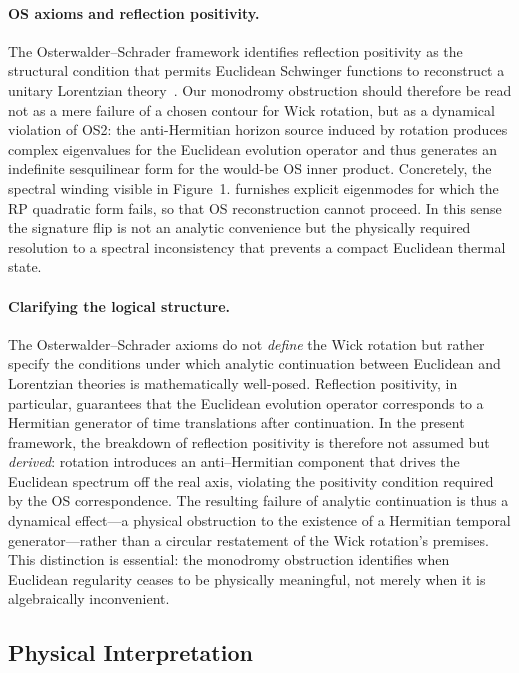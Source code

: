 \documentclass[11pt]{article}
\begin{document}
\paragraph{OS axioms and reflection positivity.}
The Osterwalder--Schrader framework identifies reflection positivity as the structural condition that permits Euclidean Schwinger functions to reconstruct a unitary Lorentzian theory~\cite{NeebOlafsson2018}.  Our monodromy obstruction should therefore be read not as a mere failure of a chosen contour for Wick rotation, but as a dynamical violation of OS2: the anti-Hermitian horizon source induced by rotation produces complex eigenvalues for the Euclidean evolution operator and thus generates an indefinite sesquilinear form for the would-be OS inner product.  Concretely, the spectral winding visible in Figure~1. furnishes explicit eigenmodes for which the RP quadratic form fails, so that OS reconstruction cannot proceed.  In this sense the signature flip is not an analytic convenience but the physically required resolution to a spectral inconsistency that prevents a compact Euclidean thermal state.

\paragraph{Clarifying the logical structure.}
The Osterwalder--Schrader axioms do not \emph{define} the Wick rotation but rather specify the conditions under which analytic continuation between Euclidean and Lorentzian theories is mathematically well-posed.  Reflection positivity, in particular, guarantees that the Euclidean evolution operator corresponds to a Hermitian generator of time translations after continuation.  In the present framework, the breakdown of reflection positivity is therefore not assumed but \emph{derived}: rotation introduces an anti--Hermitian component that drives the Euclidean spectrum off the real axis, violating the positivity condition required by the OS correspondence.  The resulting failure of analytic continuation is thus a dynamical effect---a physical obstruction to the existence of a Hermitian temporal generator---rather than a circular restatement of the Wick rotation’s premises.  This distinction is essential: the monodromy obstruction identifies when Euclidean regularity ceases to be physically meaningful, not merely when it is algebraically inconvenient.

\subsection{Physical Interpretation}
\end{document}
